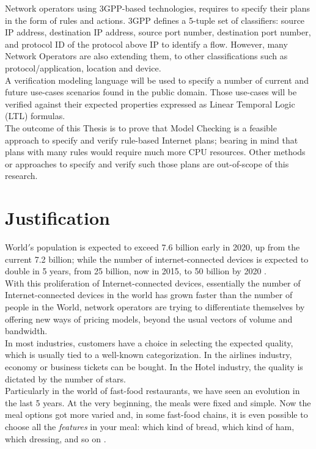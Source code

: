 Network operators using 3GPP-based technologies, requires to specify their plans in the form of rules and actions. 3GPP defines a 5-tuple set of classifiers: source IP address, destination IP address, source port number, destination port number, and protocol ID of the protocol above IP to identify a flow. However, many Network Operators are also extending them, to other classifications such as protocol/application, location and device. \\

A verification modeling language will be used to specify a number of current and future use-cases scenarios found in the public domain.  Those use-cases will be verified against their expected properties expressed as Linear Temporal Logic (LTL) formulas. \\

The outcome of this Thesis is to prove that Model Checking is a feasible approach to specify and verify rule-based Internet plans; bearing in mind that plans with many rules would require much more CPU resources. Other methods or approaches to specify and verify such those plans are out-of-scope of this research.

\section{Justification}
\noindent
World$'$s population is expected to exceed 7.6 billion early in 2020, up from the current 7.2 billion; while the number of internet-connected devices is expected to double in 5 years, from 25 billion, now in 2015, to 50 billion by 2020 \cite{Evans2011}.  \\

With this proliferation of Internet-connected devices, essentially the number of Internet-connected devices in the world has grown faster than the number of people in the World, network operators are trying to differentiate themselves by offering new ways of pricing models, beyond the usual vectors of volume and bandwidth.\\

In most industries, customers have a choice in selecting the expected quality, which is usually tied to a well-known categorization. In the airlines industry, economy or business tickets can be bought. In the Hotel industry, the quality is dictated by the number of stars. \\

Particularly in the world of fast-food restaurants, we have seen an evolution in the last 5 years. At the very beginning, the meals were fixed and simple. Now the meal options got more varied and, in some fast-food chains, it is even possible to choose all the \textit{features} in your meal: which kind of bread, which kind of ham, which dressing, and so on \cite{Cheboldaeff2011}. \\

